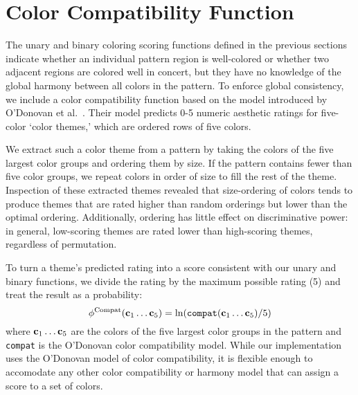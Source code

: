 \section{Color Compatibility Function}
\label{sec:colorCompat}

The unary and binary coloring scoring functions defined in the previous sections indicate whether an individual pattern region is well-colored or whether two adjacent regions are colored well in concert, but they have no knowledge of the global harmony between all colors in the pattern. To enforce global consistency, we include a color compatibility function based on the model introduced by O'Donovan et al.~. Their model predicts 0-5 numeric aesthetic ratings for five-color `color themes,' which are ordered rows of five colors. 

We extract such a color theme from a pattern by taking the colors of the five largest color groups and ordering them by size. If the pattern contains fewer than five color groups, we repeat colors in order of size to fill the rest of the theme. Inspection of these extracted themes revealed that size-ordering of colors tends to produce themes that are rated higher than random orderings but lower than the optimal ordering. Additionally, ordering has little effect on discriminative power: in general, low-scoring themes are rated lower than high-scoring themes, regardless of permutation.

To turn a theme's predicted rating into a score consistent with our unary and binary functions, we divide the rating by the maximum possible rating (5) and treat the result as a probability:
\begin{equation*}
\phi^{\textrm{Compat}}(\mathbf{c}_1 \ldots \mathbf{c}_5) = \ln(\texttt{compat}(\mathbf{c}_1 \ldots \mathbf{c}_5) / 5)
\end{equation*}
where $\mathbf{c}_1 \ldots \mathbf{c}_5$ are the colors of the five largest color groups in the pattern and \texttt{compat} is the O'Donovan color compatibility model. While our implementation uses the O'Donovan model of color compatibility, it is flexible enough to accomodate any other color compatibility or harmony model that can assign a score to a set of colors.


